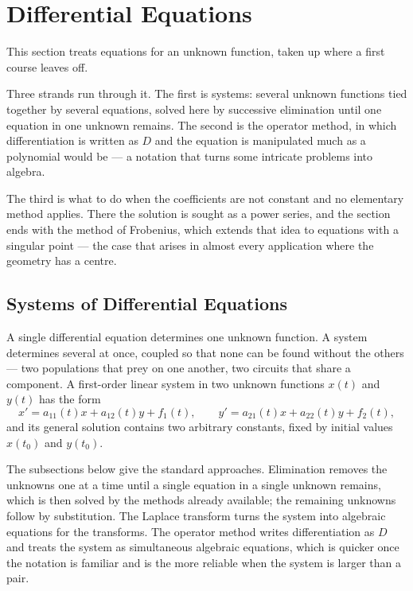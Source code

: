 \documentclass[11pt,a4paper]{article}
\theoremstyle{definition}
\begin{document}
{\color[wave]{485}\section{Differential Equations}}

This section treats equations for an unknown function, taken up where a first
course leaves off.

Three strands run through it. The first is systems: several unknown functions
tied together by several equations, solved here by successive elimination until
one equation in one unknown remains. The second is the operator method, in which
differentiation is written as $D$ and the equation is manipulated much as a
polynomial would be --- a notation that turns some intricate problems into
algebra.

The third is what to do when the coefficients are not constant and no elementary
method applies. There the solution is sought as a power series, and the section
ends with the method of Frobenius, which extends that idea to equations with a
singular point --- the case that arises in almost every application where the
geometry has a centre.


{\color[wave]{485}\subsection{Systems of Differential Equations}}

A single differential equation determines one unknown function. A system
determines several at once, coupled so that none can be found without the
others --- two populations that prey on one another, two circuits that share a
component. A first-order linear system in two unknown functions $x(t)$ and
$y(t)$ has the form
\[x' = a_{11}(t)x + a_{12}(t)y + f_1(t),\qquad y' = a_{21}(t)x + a_{22}(t)y +
f_2(t),\]
and its general solution contains two arbitrary constants, fixed by initial
values $x(t_0)$ and $y(t_0)$.

The subsections below give the standard approaches. Elimination removes the
unknowns one at a time until a single equation in a single unknown remains,
which is then solved by the methods already available; the remaining unknowns
follow by substitution. The Laplace transform turns the system into algebraic
equations for the transforms. The operator method writes differentiation as $D$
and treats the system as simultaneous algebraic equations, which is quicker once
the notation is familiar and is the more reliable when the system is larger than
a pair.
\end{document}
